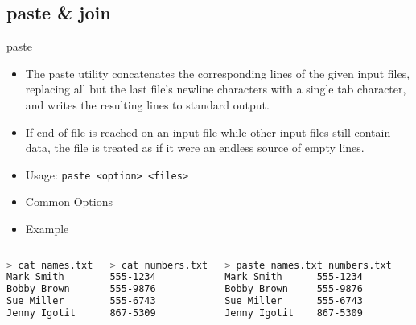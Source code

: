 \documentclass[slidestop,mathserif,compress,xcolor=svgnames]{beamer}
\begin{document}
\subsection{paste \& join}
\begin{frame}[fragile]{\small paste}
  \begin{itemize}
    \item The paste utility concatenates the corresponding lines of the given input files, replacing all but the last file's newline characters with
     a single tab character, and writes the resulting lines to standard output.  
   \item[] If end-of-file is reached on an input file while other input
     files still contain data, the file is treated as if it were an endless source of empty lines.
   \item Usage: \texttt{paste <option> <files>}
   \item Common Options
   \item Example
  \end{itemize}
  \begin{columns}
    \vspace{-0.5cm}
    \begin{lstlisting}[language=bash]
> cat names.txt
Mark Smith
Bobby Brown
Sue Miller
Jenny Igotit
    \end{lstlisting}
    \vspace{-0.5cm}
    \begin{lstlisting}[language=bash]
> cat numbers.txt
555-1234
555-9876
555-6743
867-5309
    \end{lstlisting}
    \vspace{-0.5cm}
    \begin{lstlisting}[language=bash]
> paste names.txt numbers.txt
Mark Smith      555-1234
Bobby Brown     555-9876
Sue Miller      555-6743
Jenny Igotit    867-5309
    \end{lstlisting}
  \end{columns}
\end{frame}
\end{document}
